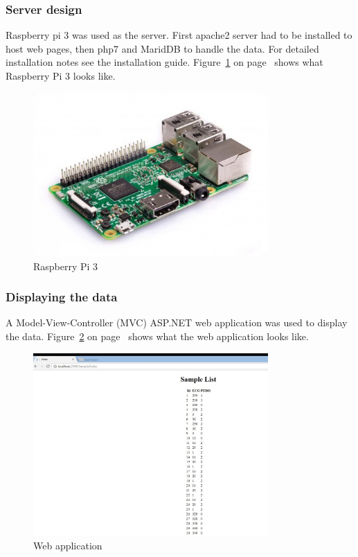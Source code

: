 \documentclass[12pt,]{article}
\numberwithin{figure}{section}
\begin{document}
\subsubsection{Server design}
Raspberry pi 3 was used as the server. First apache2 server had to be installed to host web pages, then php7 and MaridDB to handle the data. For detailed installation notes see the installation guide. Figure~\ref{fig:17} on page~\pageref{fig:17} shows what Raspberry Pi 3 looks like.
\begin{figure}[h]
  	\begin{center}
    	\includegraphics[width=0.8\textwidth]{17}
  	\end{center}
  	\caption{Raspberry Pi 3 \cite{Raspberry Pi}}
	\label{fig:17}
\end{figure}
\subsubsection{Displaying the data}
A Model-View-Controller (MVC) ASP.NET web application was used to display the data. Figure~\ref{fig:18} on page~\pageref{fig:18} shows what the web application looks like.
\begin{figure}[h]
  	\begin{center}
    	\includegraphics[width=0.8\textwidth]{18}
  	\end{center}
  	\caption{Web application}
	\label{fig:18}
\end{figure}
\newpage
\end{document}
